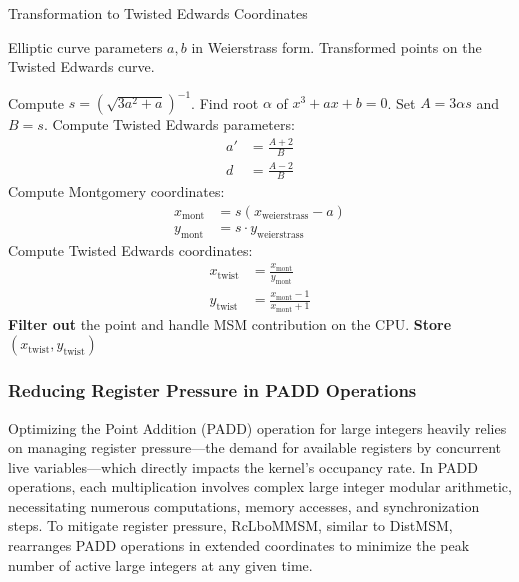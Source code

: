\documentclass[conference]{IEEEtran}
\begin{document}
\begin{algorithm}[H]
\caption{Transformation to Twisted Edwards Coordinates}
\label{alg:twisted_edwards_transformation}
\begin{algorithmic}[1]
\REQUIRE Elliptic curve parameters \( a, b \) in Weierstrass form.
\ENSURE Transformed points on the Twisted Edwards curve.

\STATE Compute \( s = (\sqrt{3 a^2 + a})^{-1} \).
\STATE Find root \( \alpha \) of \( x^3 + a x + b = 0 \).
\STATE Set \( A = 3 \alpha s \) and \( B = s \).
\STATE Compute Twisted Edwards parameters:
\begin{align*}
a' &= \frac{A + 2}{B} \\
d &= \frac{A - 2}{B}
\end{align*}
    \STATE Compute Montgomery coordinates:
    \begin{align*}
    x_{\text{mont}} &= s (x_{\text{weierstrass}} - a) \\
    y_{\text{mont}} &= s \cdot y_{\text{weierstrass}}
    \end{align*}
    \STATE Compute Twisted Edwards coordinates:
    \begin{align*}
    x_{\text{twist}} &= \frac{x_{\text{mont}}}{y_{\text{mont}}} \\
    y_{\text{twist}} &= \frac{x_{\text{mont}} - 1}{x_{\text{mont}} + 1}
    \end{align*}
        \STATE \textbf{Filter out} the point and handle MSM contribution on the CPU.
    \ENDIF
    \STATE \textbf{Store} \( (x_{\text{twist}}, y_{\text{twist}}) \)
\ENDFOR
\end{algorithmic}
\end{algorithm}

\subsubsection{\textbf{Reducing Register Pressure in PADD Operations}}
Optimizing the Point Addition (PADD) operation for large integers heavily relies on managing register pressure—the demand for available registers by concurrent live variables—which directly impacts the kernel's occupancy rate. In PADD operations, each multiplication involves complex large integer modular arithmetic, necessitating numerous computations, memory accesses, and synchronization steps. To mitigate register pressure, RcLboMMSM, similar to DistMSM, rearranges PADD operations in extended coordinates to minimize the peak number of active large integers at any given time.
\end{document}
